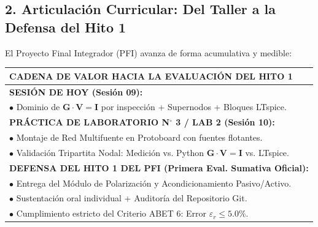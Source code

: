 \documentclass[11pt, a4paper]{article}
\begin{document}
\subsection{2. Articulación Curricular: Del Taller a la Defensa del Hito 1}
El Proyecto Final Integrador (PFI) avanza de forma acumulativa y medible:
\begin{center}
    \renewcommand{\arraystretch}{1.3}
    \begin{tabularx}{\textwidth}{|X|}
        \hline
        \cellcolor{gray!20}\textbf{CADENA DE VALOR HACIA LA EVALUACIÓN DEL HITO 1} \\
        \hline
        \textbf{SESIÓN DE HOY (Sesión 09):} \\
        $\bullet$ Dominio de $\mathbf{G}\cdot\mathbf{V} = \mathbf{I}$ por inspección + Supernodos + Bloques LTspice. \\
        \hline
        \textbf{PRÁCTICA DE LABORATORIO N$^\circ$ 3 / LAB 2 (Sesión 10):} \\
        $\bullet$ Montaje de Red Multifuente en Protoboard con fuentes flotantes. \\
        $\bullet$ Validación Tripartita Nodal: Medición vs. Python $\mathbf{G}\cdot\mathbf{V}=\mathbf{I}$ vs. LTspice. \\
        \hline
        \textbf{DEFENSA DEL HITO 1 DEL PFI (Primera Eval. Sumativa Oficial):} \\
        $\bullet$ Entrega del Módulo de Polarización y Acondicionamiento Pasivo/Activo. \\
        $\bullet$ Sustentación oral individual + Auditoría del Repositorio Git. \\
        $\bullet$ Cumplimiento estricto del Criterio ABET 6: Error $\varepsilon_r \le 5.0\%$. \\
        \hline
    \end{tabularx}
\end{center}
\end{document}
